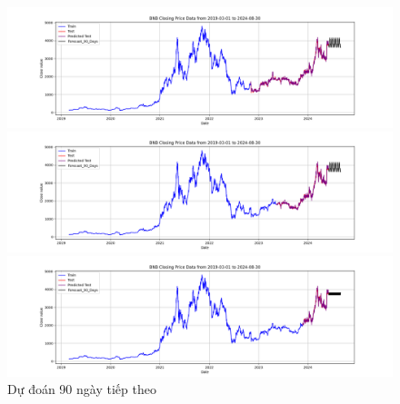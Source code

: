 \documentclass[conference]{IEEEtran}
\begin{document}
\begin{figure}[H]
    \centering
    \begin{minipage}{0.15\textwidth}
    \centering
    \includegraphics[width=1\textwidth]{Figure/RandomForest_ETH_90days_73.png}
    \end{minipage}
    \hfill
    \begin{minipage}{0.15\textwidth}
    \centering
    \includegraphics[width=1\textwidth]{Figure/RandomForest_ETH_90days_82.png}
    \end{minipage}
    \hfill
    \begin{minipage}{0.15\textwidth}
    \centering
    \includegraphics[width=1\textwidth]{Figure/RandomForest_ETH_90days_91.png}
    \end{minipage}
    \caption{Dự đoán 90 ngày tiếp theo}
    \label{fig:1}
\end{figure}
\end{document}
